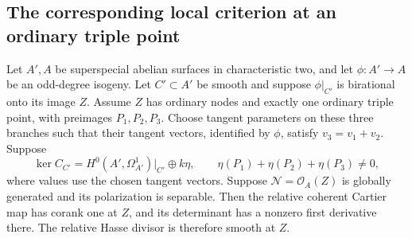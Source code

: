 \subsection{The corresponding local criterion at an ordinary triple point}
\label{subsec:ss-triple-point}

\begin{lemma}
\label{lem:ss-mixed-triple-point}
Let $A',A$ be superspecial abelian surfaces in characteristic two,
and let $\phi:A'\to A$ be an odd-degree isogeny. Let $C'\subset A'$
be smooth and suppose $\phi|_{C'}$ is birational onto its image $Z$.
Assume $Z$ has ordinary nodes and exactly one ordinary triple point,
with preimages $P_1,P_2,P_3$. Choose tangent parameters on these
three branches such that their tangent vectors, identified by
$\phi$, satisfy $v_3=v_1+v_2$.
Suppose
\[
 \ker C_{C'}=H^0(A',\Omega^1_{A'})|_{C'}\oplus k\eta,
 \qquad \eta(P_1)+\eta(P_2)+\eta(P_3)\ne0,
\]
where values use the chosen tangent vectors. Suppose
$\mathcal N=\mathcal O_A(Z)$ is globally generated and its
polarization is separable. Then the relative coherent Cartier map
has corank one at $Z$, and its determinant has a nonzero first
derivative there. The relative Hasse divisor is therefore smooth
at $Z$.
\end{lemma}
